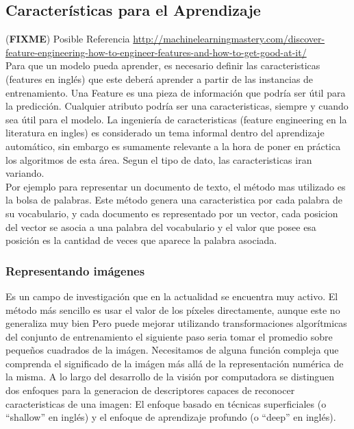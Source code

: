 \documentclass[a4paper,11pt,spanish]{book}
\newcommand*{\FIXME}[1]{{(\textbf{FIXME}) {#1}}}
\begin{document}
    \subsection{Características para el Aprendizaje}
      \FIXME{Posible Referencia \url{http://machinelearningmastery.com/discover-feature-engineering-how-to-engineer-features-and-how-to-get-good-at-it/}}\\
      Para que un modelo pueda aprender, es necesario definir las caracteristicas (features en inglés) que este deberá aprender a partir de las instancias de entrenamiento.
      Una Feature es una pieza de información que podría ser útil para la predicción. Cualquier atributo podría ser una caracteristicas, siempre y cuando sea útil para el modelo.
      La ingeniería de caracteristicas (feature engineering en la literatura en ingles) es considerado un tema informal dentro del aprendizaje automático, sin embargo es sumamente
      relevante a la hora de poner en práctica los algoritmos de esta área.
      Segun el tipo de dato, las caracteristicas iran variando. \\
      Por ejemplo para representar un documento de texto, el método mas utilizado es la bolsa de palabras.
      Este método genera una caracteristica por cada palabra de su vocabulario, y cada documento es representado por un vector, cada posicion del vector se asocia a una palabra del 
      vocabulario y el valor que posee esa posición es la cantidad de veces que aparece la palabra asociada.

      \subsubsection{Representando imágenes}
	Es un campo de investigación que en la actualidad se encuentra muy activo. El método más sencillo es usar el valor de los píxeles directamente, aunque este no generaliza muy bien
	Pero puede mejorar utilizando transformaciones algorítmicas del conjunto de entrenamiento el siguiente paso seria tomar el promedio sobre pequeños cuadrados de la imágen.
	Necesitamos de alguna función compleja que comprenda el significado de la imágen más allá de la representación numérica de la misma.
	A lo largo del desarrollo de la visión por computadora se distinguen dos enfoques para la generacion de descriptores capaces de reconocer caracteristicas de una imagen: 
	El enfoque basado en técnicas superficiales (o “shallow” en inglés) y el enfoque de aprendizaje profundo (o “deep” en inglés).
\end{document}
